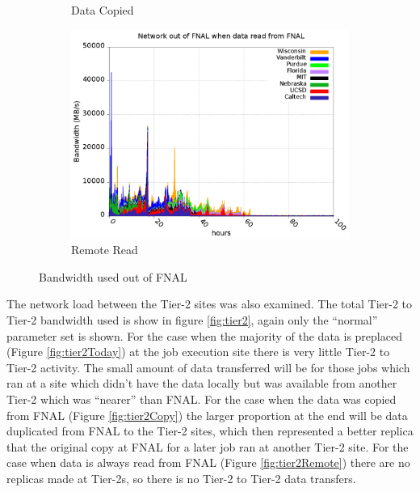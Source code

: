 \documentclass[a4paper]{jpconf}
\begin{document}
\begin{figure}
\begin{subfigure}{0.3\textwidth}
    \caption{Data Copied\label{fig:fnalOutCopy}}
  \end{subfigure}
  \begin{subfigure}{0.3\textwidth}
    \includegraphics[width=\textwidth]{figures/F_FP0_RP0Data.png}
    \caption{Remote Read\label{fig:fnalOutRemote}}
  \end{subfigure}
  \caption{Bandwidth used out of FNAL\label{fig:fnalOut}}
\end{figure}

The network load between the Tier-2 sites was also examined. The total
Tier-2 to Tier-2 bandwidth used is show in figure \ref{fig:tier2},
again only the ``normal'' parameter set is shown. For the case when
the majority of the data is preplaced (Figure \ref{fig:tier2Today}) at
the job execution site there is very little Tier-2 to Tier-2
activity. The small amount of data transferred will be for those jobs
which ran at a site which didn't have the data locally but was
available from another Tier-2 which was ``nearer'' than FNAL. For the
case when the data was copied from FNAL (Figure \ref{fig:tier2Copy})
the larger proportion at the end will be data duplicated from FNAL to
the Tier-2 sites, which then represented a better replica that the
original copy at FNAL for a later job ran at another Tier-2 site. For
the case when data is always read from FNAL (Figure
\ref{fig:tier2Remote}) there are no replicas made at Tier-2s, so there
is no Tier-2 to Tier-2 data transfers.
\end{document}
